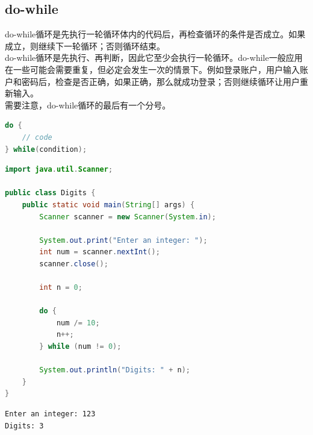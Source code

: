 \vspace{0.5cm}

\subsection{do-while}

do-while循环是先执行一轮循环体内的代码后，再检查循环的条件是否成立。如果成立，则继续下一轮循环；否则循环结束。\\

do-while循环是先执行、再判断，因此它至少会执行一轮循环。do-while一般应用在一些可能会需要重复，但必定会发生一次的情景下。例如登录账户，用户输入账户和密码后，检查是否正确，如果正确，那么就成功登录；否则继续循环让用户重新输入。\\

需要注意，do-while循环的最后有一个分号。

\vspace{-0.5cm}

\begin{lstlisting}[language=Java]
do {
    // code
} while(condition);
\end{lstlisting}

\vspace{0.5cm}


\begin{lstlisting}[language=Java]
import java.util.Scanner;

public class Digits {
    public static void main(String[] args) {
        Scanner scanner = new Scanner(System.in);

        System.out.print("Enter an integer: ");
        int num = scanner.nextInt();
        scanner.close();

        int n = 0;

        do {
            num /= 10;
            n++;
        } while (num != 0);

        System.out.println("Digits: " + n);
    }
}
\end{lstlisting}

\begin{tcolorbox}
    \begin{verbatim}
Enter an integer: 123
Digits: 3
\end{verbatim}
\end{tcolorbox}

\vspace{0.5cm}


